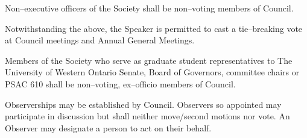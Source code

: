 \begin{longenum}[label*=\thesubsection.\arabic*., align=left]
    \item Non--executive officers of the Society shall be non--voting members of Council. 
    	\begin{longenum}[label*=\arabic*., align=left]
    \item Notwithstanding the above, the Speaker is permitted to cast a tie--breaking vote at Council meetings and Annual General Meetings.
  	\end{longenum}
    \item Members of the Society who serve as graduate student representatives to The University of Western Ontario Senate, Board of Governors, committee chairs or PSAC 610  shall be non--voting, ex--officio members of Council.
    \item Observerships may be established by Council. Observers so appointed may participate in discussion but shall neither move/second motions nor vote. An Observer may designate a person to act on their behalf. 
\end{longenum}



